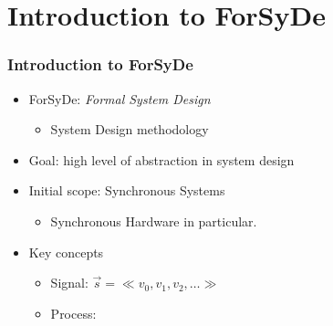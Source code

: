 \documentclass{beamer}
\begin{document}
\section{Introduction to ForSyDe}
\begin{frame}
  \frametitle{Introduction to ForSyDe}

  \begin{itemize}
  \item
    ForSyDe: \textit{Formal System Design}
    \begin{itemize}
    \item System Design methodology
    \end{itemize} 
  \item
    Goal: high level of abstraction in system design
    \pause
  \item
    Initial scope: Synchronous Systems
    \begin{itemize}
      \item Synchronous Hardware in particular.
    \end{itemize}
    \pause
  \item
    Key concepts
    \begin{itemize}
    \item Signal: \hspace{.5cm} $\overrightarrow{s} = \ll v_0,v_1,v_2,\dots \gg$
      \pause
        \vspace{.3cm}
      \item Process:\hspace{.4cm}
    \end{itemize}
  \end{itemize}
\end{frame}
\beamerdefaultoverlayspecification{<+->}
\end{document}
